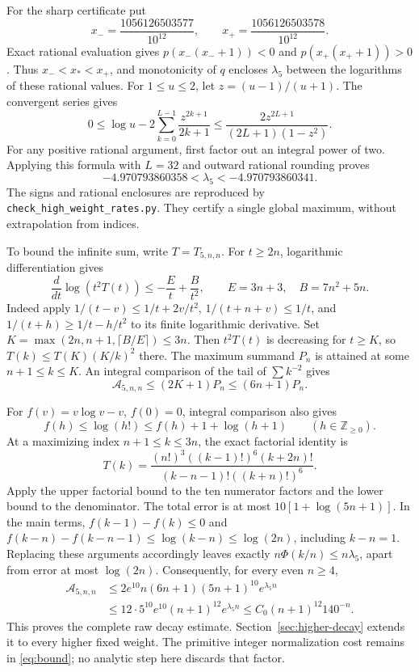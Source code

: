 \documentclass[11pt]{article}
\theoremstyle{remark}
\newcommand{\Z}{\mathbb Z}
\newcommand{\cA}{\mathcal A}
\newcommand{\la}{\lambda}
\begin{document}
For the sharp certificate put
\[
 x_- =\frac{1056126503577}{10^{12}},\qquad
 x_+ =\frac{1056126503578}{10^{12}}.
\]
Exact rational evaluation gives \(p(x_-(x_-+1))<0\) and
\(p(x_+(x_++1))>0\). Thus \(x_-<x_*<x_+\), and monotonicity
of \(q\) encloses \(\la_5\) between the logarithms of these rational values.
For \(1\le u\le2\), let \(z=(u-1)/(u+1)\). The convergent series gives
\[
 0\le\log u-2\sum_{k=0}^{L-1}\frac{z^{2k+1}}{2k+1}
 \le\frac{2z^{2L+1}}{(2L+1)(1-z^2)}.
\]
For any positive rational argument, first factor out an integral power of
two. Applying this formula with \(L=32\) and outward rational rounding
proves
\[
 -4.970793860358<\la_5<-4.970793860341.
\]
The signs and rational enclosures are reproduced by
\texttt{check\_high\_weight\_rates.py}. They certify a single global maximum,
without extrapolation from indices.

To bound the infinite sum, write \(T=T_{5,n,n}\). For \(t\ge2n\),
logarithmic differentiation gives
\[
 \frac{d}{dt}\log(t^2T(t))\le-\frac{E}{t}+\frac{B}{t^2},
 \qquad E=3n+3,\quad B=7n^2+5n.
\]
Indeed apply \(1/(t-v)\le1/t+2v/t^2\),
\(1/(t+n+v)\le1/t\), and \(1/(t+h)\ge1/t-h/t^2\)
to its finite logarithmic derivative. Set
\(K=\max(2n,n+1,\lceil B/E\rceil)\le3n\).
Then \(t^2T(t)\) is decreasing for \(t\ge K\), so
\(T(k)\le T(K)(K/k)^2\) there. The maximum summand \(P_n\)
is attained at some \(n+1\le k\le K\). An integral comparison of the
tail of \(\sum k^{-2}\) gives
\[
 \cA_{5,n,n}\le(2K+1)P_n\le(6n+1)P_n.
\]

For \(f(v)=v\log v-v\), \(f(0)=0\), integral comparison also gives
\[
 f(h)\le\log(h!)\le f(h)+1+\log(h+1)\qquad(h\in\Z_{\ge0}).
\]
At a maximizing index \(n+1\le k\le3n\), the exact factorial identity is
\[
 T(k)=\frac{(n!)^3((k-1)!)^6(k+2n)!}
             {(k-n-1)!((k+n)!)^6}.
\]
Apply the upper factorial bound to the ten numerator factors and the lower
bound to the denominator. The total error is at most
\(10[1+\log(5n+1)]\). In the main terms,
\(f(k-1)-f(k)\le0\) and
\(f(k-n)-f(k-n-1)\le\log(k-n)\le\log(2n)\), including \(k-n=1\).
Replacing these arguments accordingly leaves exactly
\(n\Phi(k/n)\le n\la_5\), apart from error at most \(\log(2n)\).
Consequently, for every even \(n\ge4\),
\begin{align*}
 \cA_{5,n,n}
 &\le2e^{10}n(6n+1)(5n+1)^{10}e^{\la_5n}\\
 &\le12\cdot5^{10}e^{10}(n+1)^{12}e^{\la_5n}
 \le C_0(n+1)^{12}140^{-n}.
\end{align*}
This proves the complete raw decay estimate. Section~\ref{sec:higher-decay} extends it to every
higher fixed weight. The primitive integer normalization cost remains in
\eqref{eq:bound}; no analytic step here discards that factor.
\end{document}
